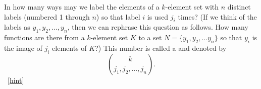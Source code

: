 \documentclass{book}
\begin{document}
\setcounter{project}{281}
\addtocounter{project}{-1}
\begin{activity}[]\label{activity-274}
\hypertarget{p-1468}{}%
In how many ways may we label the elements of a \(k\)-element set with \(n\) distinct labels (numbered 1 through \(n\)) so that label \(i\) is used \(j_i\) times? (If we think of the labels as \(y_1, y_2, \ldots, y_n\), then we can rephrase this question as follows.  How many functions are there from a \(k\)-element set \(K\) to a set \(N=\{y_1,y_2,\ldots y_n\}\) so that \(y_i\) is the image of \(j_i\) elements of \(K\)?) This number is called a  and denoted by%
\begin{equation*}
\binom{k}{j_1,j_2,\ldots, j_n}.
\end{equation*}
%
~\hfill{\tiny\hyperlink{a-281}{[hint]}\hypertarget{q-281}{}}\end{activity}
\end{document}
